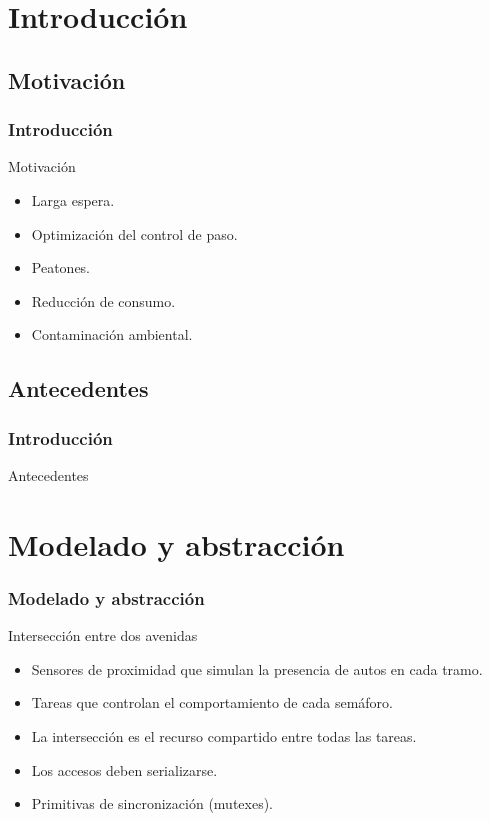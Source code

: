 \section{Introducción} 

\subsection{Motivación}

\begin{frame}
	\frametitle{Introducción}
		\begin{block}{Motivación}
			\begin{itemize}
				\item Larga espera.
				\item Optimización del control de paso.
				\item Peatones.
				\item Reducción de consumo.
				\item Contaminación ambiental.
			\end{itemize}
		\end{block}
\end{frame}

\subsection{Antecedentes}

\begin{frame}
\frametitle{Introducción}
\begin{block}{Antecedentes}
\end{block}
\end{frame}

\section{Modelado y abstracción}

\begin{frame}
\frametitle{Modelado y abstracción}
\begin{block}{Intersección entre dos avenidas}
	\begin{itemize}
		\item Sensores de proximidad que simulan la presencia de autos en cada tramo.
		\item Tareas que controlan el comportamiento de cada semáforo.
		\item La intersección es el recurso compartido entre todas las tareas.
		\item Los accesos deben serializarse.
		\item Primitivas de sincronización (mutexes).
	\end{itemize}
\end{block}
\end{frame}

